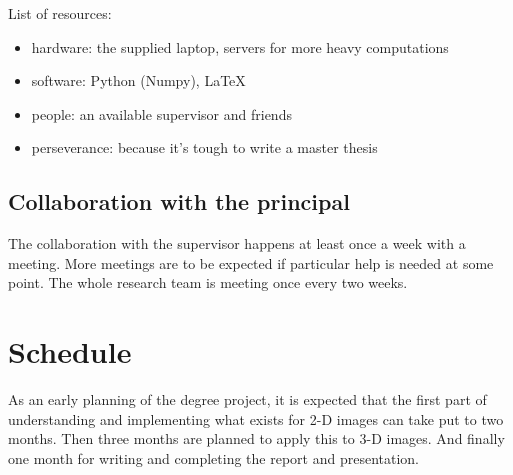 \documentclass[12pt]{article}
\begin{document}
List of resources: \\
\begin{itemize}
 \item hardware: the supplied laptop, servers for more heavy computations
 \item software: Python (Numpy), \LaTeX
 \item people: an available supervisor and friends
 \item perseverance: because it's tough to write a master thesis
\end{itemize}

\subsection*{Collaboration with the principal}

The collaboration with the supervisor happens at least once a week with a meeting.
More meetings are to be expected if particular help is needed at some point.
The whole research team is meeting once every two weeks.

\section*{Schedule}

As an early planning of the degree project, it is expected that the first part of understanding and implementing what exists for 2-D images can take put to two months.
Then three months are planned to apply this to 3-D images.
And finally one month for writing and completing the report and presentation.
\end{document}
